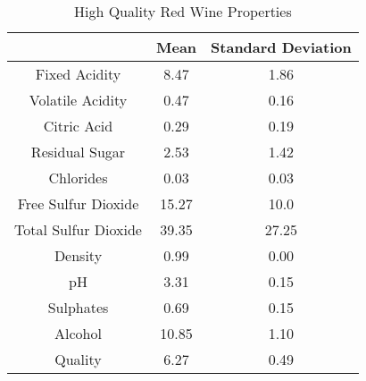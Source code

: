 \begin{table}[ht]
\caption{High Quality Red Wine Properties}
\begin{center}
\begin{tabular}{ccc}
  \hline
         & Mean & Standard Deviation\\ 
  \hline
  Fixed Acidity & 8.47 & 1.86 \\ 
  Volatile Acidity & 0.47 & 0.16 \\ 
  Citric Acid & 0.29 & 0.19\\ 
  Residual Sugar & 2.53 & 1.42\\ 
  Chlorides & 0.03 & 0.03\\ 
  Free Sulfur Dioxide & 15.27 & 10.0\\ 
  Total Sulfur Dioxide & 39.35 & 27.25\\ 
  Density & 0.99 & 0.00\\ 
  pH & 3.31 & 0.15\\ 
  Sulphates & 0.69 & 0.15\\ 
  Alcohol & 10.85 & 1.10\\ 
  Quality & 6.27 & 0.49\\ 
   \hline
\end{tabular}
\end{center}
\end{table}   
